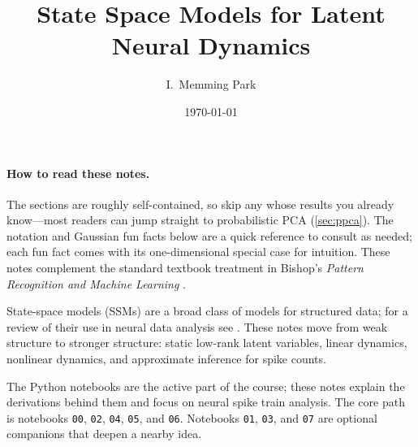 \documentclass[11pt]{article}
\title{State Space Models for Latent Neural Dynamics}
\author{I.~Memming Park}
\date{\today}
\theoremstyle{plain}
\theoremstyle{definition}
\theoremstyle{remark}
\theoremstyle{definition}
\begin{document}
\maketitle

\paragraph{How to read these notes.}
The sections are roughly self-contained, so skip any whose results you already
know---most readers can jump straight to probabilistic PCA (\cref{sec:ppca}).
The notation and Gaussian fun facts below are a quick
reference to consult as needed; each fun fact comes with its one-dimensional
special case for intuition. These notes complement the standard textbook
treatment in Bishop's \emph{Pattern Recognition and Machine Learning}
\parencite{Bishop2006-to}.

State-space models (SSMs) are a broad class of models for structured
data; for a review of their use in neural data analysis see
\parencite{Paninski2010-bk}. These notes move from weak structure to stronger
structure: static low-rank latent variables, linear dynamics, nonlinear dynamics,
and approximate inference for spike counts.

The Python notebooks are the active part of the course; these notes explain the
derivations behind them and focus on neural spike train analysis.
The core path is notebooks \texttt{00}, \texttt{02},
\texttt{04}, \texttt{05}, and \texttt{06}. Notebooks \texttt{01}, \texttt{03},
and \texttt{07} are optional companions that deepen a nearby idea.
\end{document}
